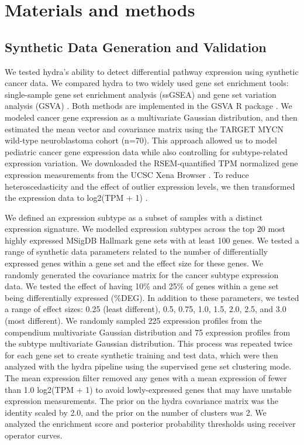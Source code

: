 \documentclass[10pt,letterpaper]{article}
\begin{document}
\section*{Materials and methods}
\subsection*{Synthetic Data Generation and Validation}
We tested hydra's ability to detect differential pathway expression using synthetic cancer data. We compared hydra to two widely used gene set enrichment tools: single-sample gene set enrichment analysis (ssGSEA) and gene set variation analysis (GSVA) \cite{barbieSystematicRNAInterference2009, hanzelmannGSVAGeneSet2013, tarcaComparisonGeneSet2013}. Both methods are implemented in the GSVA R package \cite{hanzelmannGSVAGeneSet2013}. We modeled cancer gene expression as a multivariate Gaussian distribution, and then estimated the mean vector and covariance matrix using the TARGET MYCN wild-type neuroblastoma cohort (n=70). This approach allowed us to model pediatric cancer gene expression data while also controlling for subtype-related expression variation. We downloaded the RSEM-quantified TPM normalized gene expression measurements from the UCSC Xena Browser \cite{goldmanUCSCXenaPlatform2018}. To reduce heteroscedasticity and the effect of outlier expression levels, we then transformed the expression data to log2(TPM + 1) \cite{zwienerTransformingRNASeqData2014}.
 
We defined an expression subtype as a subset of samples with a distinct expression signature. We modelled expression subtypes across the top 20 most highly expressed MSigDB Hallmark gene sets with at least 100 genes. We tested a range of synthetic data parameters related to the number of differentially expressed genes within a gene set and the effect size for these genes. We randomly generated the covariance matrix for the cancer subtype expression data. We tested the effect of having 10\% and 25\% of genes within a gene set being differentially expressed (\%DEG). In addition to these parameters, we tested a range of effect sizes: 0.25 (least different), 0.5, 0.75, 1.0, 1.5, 2.0, 2.5, and 3.0 (most different). We randomly sampled 225 expression profiles from the compendium multivariate Gaussian distribution and 75 expression profiles from the subtype multivariate Gaussian distribution. This process was repeated twice for each gene set to create synthetic training and test data, which were then analyzed with the hydra pipeline using the supervised gene set clustering mode. The mean expression filter removed any genes with a mean expression of fewer than 1.0 log2(TPM + 1) to avoid lowly-expressed genes that may have unstable expression measurements. The prior on the hydra covariance matrix was the identity scaled by 2.0, and the prior on the number of clusters was 2. We analyzed the enrichment score and posterior probability thresholds using receiver operator curves.
\end{document}
